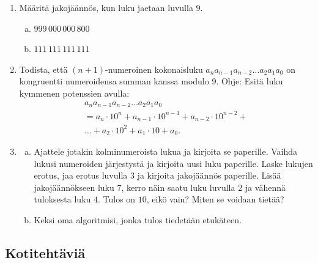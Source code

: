 \begin{enumerate}
\item
Määritä jakojäännös, kun luku jaetaan luvulla $9$.
\begin{enumerate}[a)]
\item $999\, 000\, 000\, 800$
\item $111\, 111\, 111\, 111$
\end{enumerate}

\item
Todista, että $(n+1)$-numeroinen kokonaisluku $a_na_{n-1}a_{n-2}\ldots a_2a_1a_0$ on kongruentti numeroidensa summan kanssa modulo 9. Ohje: Esitä luku kymmenen potenssien avulla:
\begin{multline*}
a_na_{n-1}a_{n-2}\ldots a_2a_1a_0\\ = a_n \cdot 10^n + a_{n-1}\cdot 10^{n-1} + a_{n-2} \cdot 10^{n-2} + \\
\ldots + a_2 \cdot 10^2 + a_1 \cdot 10 + a_0.
\end{multline*}

\item
\begin{enumerate}[a)]
\item Ajattele jotakin kolminumeroista lukua ja kirjoita se paperille. Vaihda lukusi numeroiden järjestystä ja kirjoita uusi luku paperille. Laske lukujen erotus, jaa erotus luvulla $3$ ja kirjoita jakojäännös paperille. Lisää jakojäännökseen luku $7$, kerro näin saatu luku luvulla $2$ ja vähennä tuloksesta luku $4$. Tulos on $10$, eikö vain? Miten se voidaan tietää?
\item Keksi oma algoritmisi, jonka tulos tiedetään etukäteen.
\end{enumerate}

\end{enumerate}

\subsection*{Kotitehtäviä}

